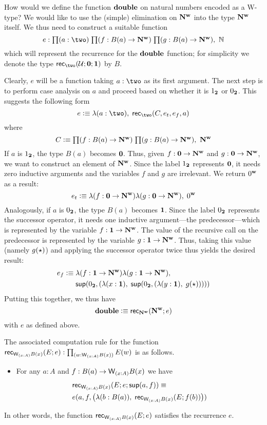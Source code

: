 How would we define the function $\mathbf{double}$ on natural numbers encoded as a W-type? We would like to use the (simple) elimination on $\mathbf{N^w}$ into the type $\mathbf{N^w}$ itself. We thus need to construct a suitable function
\[e : \prd{a : \two}{f : B(a) \to \natw}{g : B(a) \to \natw} \nat\]
which will represent the recurrence for the $\mathbf{double}$ function; for simplicity we denote the type $\rec\two(\bbU;\zero;\one)$ by $B$.

Clearly, $e$ will be a function taking $a : \two$ as its first argument. The next step is to perform case analysis on $a$ and proceed based on whether it is $1_{\mathbf{2}}$ or $0_{\mathbf{2}}$. This suggests the following form
\[ e \defeq \lambda(a : \two), \; \rec\two(C,e_t,e_f,a) \]
where \[C \defeq \prd{f : B(a) \to \natw}{g : B(a) \to \natw} \natw\]
If $a$ is $1_{\mathbf{2}}$, the type $B(a)$ becomes $\mathbf{0}$. Thus, given $f : \mathbf{0} \to \mathbf{N^w}$ and $g : \mathbf{0} \to \mathbf{N^w}$, we want to construct an element of $\mathbf{N^w}$. Since the label $1_{\mathbf{2}}$ represents $\mathbf{0}$, it needs zero inductive arguments and the variables $f$ and $g$ are irrelevant. We return $0^\mathbf{w}$ as a result:
\[ e_t \vcentcolon\equiv \lambda(f:\mathbf{0} \to \mathbf{N^w})\lambda(g:\mathbf{0} \to \mathbf{N^w}), \; 0^\mathbf{w} \]
Analogously, if $a$ is $0_{\mathbf{2}}$, the type $B(a)$ becomes $\mathbf{1}$.
Since the label $0_{\mathbf{2}}$ represents the successor operator, it needs one inductive argument---the predecessor---which is represented by the variable $f : \mathbf{1} \to \mathbf{N^w}$.
The value of the recursive call on the predecessor is represented by the variable $g : \mathbf{1} \to \mathbf{N^w}$.
Thus, taking this value (namely $g(\star)$) and applying the successor operator twice thus yields the desired result:
\begin{align*}
 e_f \vcentcolon\equiv & \; \lambda(f:\mathbf{1} \to \mathbf{N^w})\lambda(g:\mathbf{1} \to \mathbf{N^w}), \\
  & \; \mathsf{sup}(0_{\mathbf{2}}, (\lambda (x:\mathbf{1}), \; \mathsf{sup}(0_{\mathbf{2}}, (\lambda (y : \mathbf{1}), \; g(\star)))))
\end{align*}
Putting this together, we thus have
\[ \mathbf{double} \vcentcolon\equiv \mathsf{rec}_{\mathbf{N^w}}(\mathbf{N^w}; e) \]
with $e$ as defined above.

The associated computation rule for the function $\rec{\wtype{x:A} B(x)}(E;e) : \prd{w : \wtype{x:A} B(x)} E(w)$ is as follows.
\begin{itemize}
\item For any $a : A$ and $f : B(a) \to \wtype{x:A} B(x)$ we have 
\begin{align*}
& \rec{\wtype{x:A} B(x)}(E;e;\supp(a,f)) \equiv \\ & e(a,f,\big(\lambda (b : B(a)), \; \rec{\wtype{x:A} B(x)}(E;f(b))\big))
\end{align*}
\end{itemize}
In other words, the function $\rec{\wtype{x:A} B(x)}(E;e)$ satisfies the recurrence $e$.

